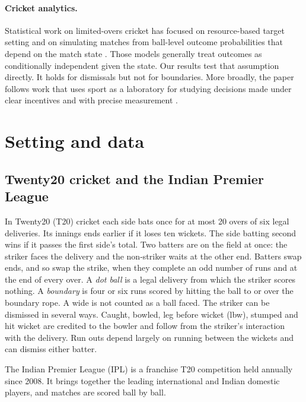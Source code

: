\documentclass[11pt]{article}
\begin{document}
\paragraph{Cricket analytics.} Statistical work on limited-overs cricket has focused on resource-based target setting \citep{duckworth1998fair} and on simulating matches from ball-level outcome probabilities that depend on the match state \citep{swartz2009modelling,davis2015simulator}. Those models generally treat outcomes as conditionally independent given the state. Our results test that assumption directly. It holds for dismissals but not for boundaries. More broadly, the paper follows work that uses sport as a laboratory for studying decisions made under clear incentives and with precise measurement \citep{kahn2000sports,romer2006firms,walker2001minimax,chiappori2002testing}.

\section{Setting and data}\label{sec:data}

\subsection{Twenty20 cricket and the Indian Premier League}

In Twenty20 (T20) cricket each side bats once for at most 20 overs of six legal deliveries. Its innings ends earlier if it loses ten wickets. The side batting second wins if it passes the first side's total. Two batters are on the field at once: the striker faces the delivery and the non-striker waits at the other end. Batters swap ends, and so swap the strike, when they complete an odd number of runs and at the end of every over. A \emph{dot ball} is a legal delivery from which the striker scores nothing. A \emph{boundary} is four or six runs scored by hitting the ball to or over the boundary rope. A wide is not counted as a ball faced. The striker can be dismissed in several ways. Caught, bowled, leg before wicket (lbw), stumped and hit wicket are credited to the bowler and follow from the striker's interaction with the delivery. Run outs depend largely on running between the wickets and can dismiss either batter.

The Indian Premier League (IPL) is a franchise T20 competition held annually since 2008. It brings together the leading international and Indian domestic players, and matches are scored ball by ball.
\end{document}
